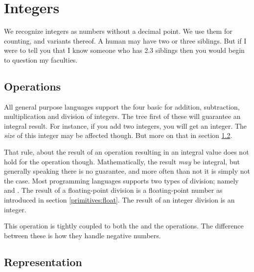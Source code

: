 \section{Integers}

We recognize integers as numbers without a decimal point. We use them for counting, and variants thereof. A human may have two or three siblings. But if I were to tell you that I know someone who has 2.3 siblings then you would begin to question my faculties.

\subsection{Operations}

All general purpose languages support the four basic  for addition, subtraction, multiplication and division of integers. The tree first of these will guarantee an integral result. For instance, if you add two integers, you will get an integer. The \textsl{size} of this integer may be affected though. But more on that in section \ref{primitives:int:representation}.

That rule, about the result of an operation resulting in an integral value does not hold for the  operation though. Mathematically, the result \textsl{may} be integral, but generally speaking there is no guarantee, and more often than not it is simply not the case. Most programming languages supports two types of division; namely  and . The result of a floating-point division is a floating-point number as introduced in section \ref{primitives:float}. The result of an integer division is an integer.

This operation is tightly coupled to both the  and the  operations. The difference between these is how they handle negative numbers.


\subsection{Representation}
\label{primitives:int:representation}

